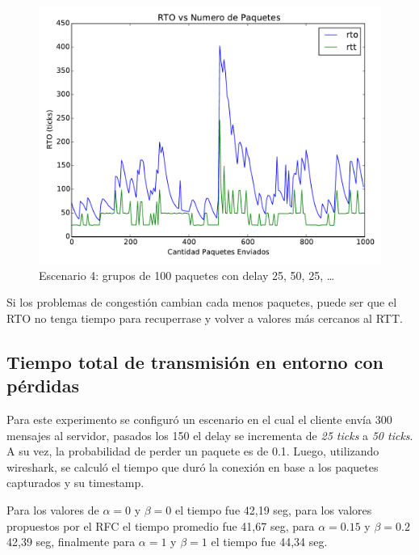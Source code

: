 		\begin{figure}[H]
			\includegraphics[width=\textwidth]{imagenes/congestion_short.pdf}
			\caption*{Escenario 4: grupos de 100 paquetes con delay 25, 50, 25, \ldots}
		\end{figure}

		Si los problemas de congesti\'on cambian cada menos paquetes, puede ser
		que el RTO no tenga tiempo para recuperrase y volver a valores m\'as
		cercanos al RTT.

    \subsection{Tiempo total de transmisi\'on en entorno con p\'erdidas}
        
        Para este experimento se configur\'o un escenario en el cual el 
        cliente env\'ia 300 mensajes al servidor, pasados los 150 el delay
        se incrementa de \textit{25 ticks} a \textit{50 ticks}. A su vez,
        la probabilidad de perder un paquete es de 0.1.
        Luego, utilizando wireshark, se calcul\'o el tiempo que dur\'o la
        conexi\'on en base a los paquetes capturados y su timestamp.
        
        Para los valores de $\alpha=0$ y $\beta=0$ el tiempo fue 42,19 seg,
        para los valores propuestos por el RFC el tiempo promedio fue
        41,67 seg, para $\alpha=0.15$ y $\beta=0.2$ 42,39 seg, finalmente  
        para $\alpha=1$ y $\beta=1$ el tiempo fue 44,34 seg.
        

